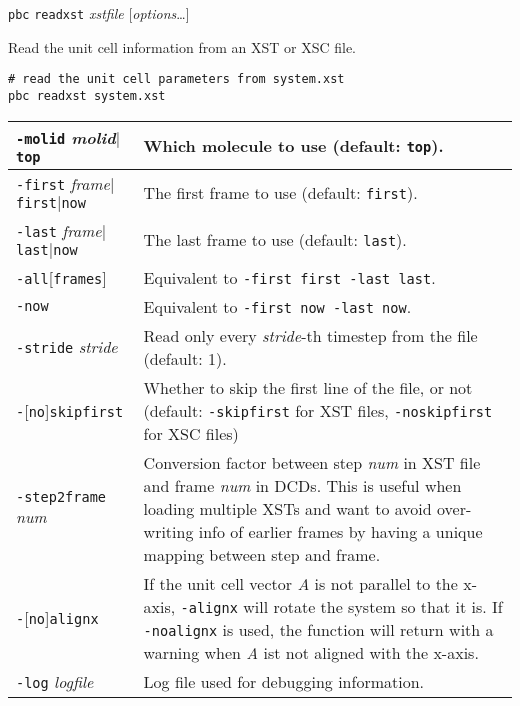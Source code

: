 \documentclass[a4paper, DIV12]{scrartcl}
\begin{document}
\texttt{pbc} \texttt{readxst} \textit{xstfile} [\textit{options}\dots]

Read the unit cell information from an XST or XSC file.

\begin{Verbatim}
# read the unit cell parameters from system.xst
pbc readxst system.xst
\end{Verbatim}


\begin{tabular}{|p{}|p{}|}
\hline

\texttt{-molid} \textit{molid}$|$\texttt{top}
& Which molecule to use (default: \texttt{top}).
\\ \hline

\texttt{-first} \textit{frame}$|$\texttt{first}$|$\texttt{now}
& The first frame to use (default: \texttt{first}).
\\ \hline

\texttt{-last} \textit{frame}$|$\texttt{last}$|$\texttt{now}
& The last frame to use (default: \texttt{last}).
\\ \hline

\texttt{-all}[\texttt{frames}]
& Equivalent to \texttt{-first first -last last}.
\\ \hline

\texttt{-now}
& Equivalent to \texttt{-first now -last now}.
\\ \hline

\texttt{-stride} \textit{stride}
& Read only every \textit{stride}-th timestep from the
file (default: 1).
\\ \hline

\texttt{-}[\texttt{no}]\texttt{skipfirst}
& Whether to skip the first line of the file, or not
(default: \texttt{-skipfirst} for XST files, \texttt{-noskipfirst} for
XSC files)
\\ \hline

\texttt{-step2frame} \textit{num}
& Conversion factor between step \textit{num} in XST file
and frame \textit{num} in DCDs. This is useful when loading multiple
XSTs and want to avoid over-writing info of earlier frames
by having a unique mapping between step and frame.
\\ \hline

\texttt{-}[\texttt{no}]\texttt{alignx}
& If the unit cell vector \textit{A} is not parallel to the x-axis,
\texttt{-alignx} will rotate the system so that it is. If
\texttt{-noalignx} is used, the function will return with a warning
when \textit{A} ist not aligned with the x-axis.
\\ \hline

\texttt{-log} \textit{logfile}
& Log file used for debugging information.
\\ \hline
\end{tabular}
\end{document}
